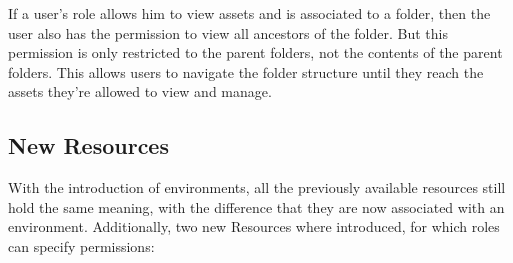 
If a user's role allows him to view assets and is associated to a folder, then the user
also has the permission to view all ancestors of the folder.
But this permission is only restricted to the parent folders, not the contents of the parent folders.
This allows users to navigate the folder structure until they reach the assets they're
allowed to view and manage.


\subsection{New Resources}

With the introduction of environments, all the previously available resources still hold
the same meaning, with the difference that they are now associated with an environment.
Additionally, two new Resources where introduced, for which roles can specify permissions:

